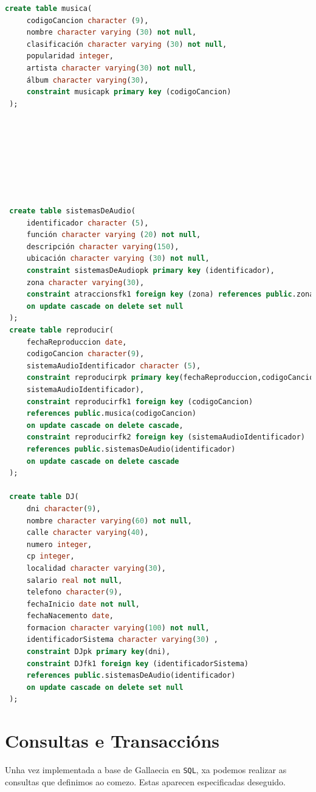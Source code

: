 \documentclass[12pt,a4paper]{book}
\theoremstyle{definition}
\theoremstyle{break}
\begin{document}
\begin{lstlisting}[language=sql,style=sql,tabsize=5,  escapechar={|},
		keywordstyle=\color{blue}\ttfamily,
		stringstyle=\color{red}\ttfamily]
 create table musica(
	 codigoCancion character (9),
	 nombre character varying (30) not null,
	 clasificación character varying (30) not null,
	 popularidad integer,
	 artista character varying(30) not null,
	 álbum character varying(30),
	 constraint musicapk primary key (codigoCancion)
 );
 
 
 
 
 
 
 
 
 create table sistemasDeAudio(
	 identificador character (5),
	 función character varying (20) not null,
	 descripción character varying(150),
	 ubicación character varying (30) not null,
	 constraint sistemasDeAudiopk primary key (identificador),
	 zona character varying(30),
	 constraint atraccionsfk1 foreign key (zona) references public.zonas(nome)
	 on update cascade on delete set null
 );
 create table reproducir(
	 fechaReproduccion date,
	 codigoCancion character(9),
	 sistemaAudioIdentificador character (5),
	 constraint reproducirpk primary key(fechaReproduccion,codigoCancion,
	 sistemaAudioIdentificador),
	 constraint reproducirfk1 foreign key (codigoCancion)
	 references public.musica(codigoCancion)
	 on update cascade on delete cascade,
	 constraint reproducirfk2 foreign key (sistemaAudioIdentificador)
	 references public.sistemasDeAudio(identificador)
	 on update cascade on delete cascade
 );
 
 create table DJ(
	 dni character(9),
	 nombre character varying(60) not null,
	 calle character varying(40),
	 numero integer,
	 cp integer,
	 localidad character varying(30),
	 salario real not null,
	 telefono character(9),
	 fechaInicio date not null,
	 fechaNacemento date,
	 formacion character varying(100) not null,
	 identificadorSistema character varying(30) ,
	 constraint DJpk primary key(dni),
	 constraint DJfk1 foreign key (identificadorSistema)
	 references public.sistemasDeAudio(identificador)
	 on update cascade on delete set null
 );
	\end{lstlisting}
	
	\section{Consultas e Transaccións}
	Unha vez implementada a base de {\logo Gallaecia} en \texttt{SQL}, xa podemos realizar as consultas que definimos ao comezo. Estas aparecen especificadas deseguido.
	
\end{document}
